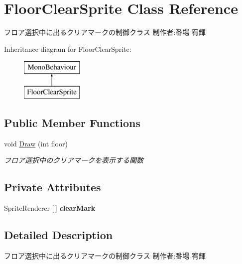 \hypertarget{class_floor_clear_sprite}{}\section{Floor\+Clear\+Sprite Class Reference}
\label{class_floor_clear_sprite}


フロア選択中に出るクリアマークの制御クラス 制作者\+:番場 宥輝  


Inheritance diagram for Floor\+Clear\+Sprite\+:\begin{figure}[H]
\begin{center}
\leavevmode
\includegraphics[height=2.000000cm]{class_floor_clear_sprite}
\end{center}
\end{figure}
\subsection*{Public Member Functions}
\begin{DoxyCompactItemize}
\item 
void \hyperlink{class_floor_clear_sprite_aff9b6239db40f5f9e25601bf6562fbbc}{Draw} (int floor)
\begin{DoxyCompactList}\small\item\em フロア選択中のクリアマークを表示する関数 \end{DoxyCompactList}\end{DoxyCompactItemize}
\subsection*{Private Attributes}
\begin{DoxyCompactItemize}
\item 
\mbox{\label{class_floor_clear_sprite_aef111391d6ac064c8768f873a3ac52bd}} 
Sprite\+Renderer \mbox{[}$\,$\mbox{]} {\bfseries clear\+Mark}
\end{DoxyCompactItemize}


\subsection{Detailed Description}
フロア選択中に出るクリアマークの制御クラス 制作者\+:番場 宥輝 



